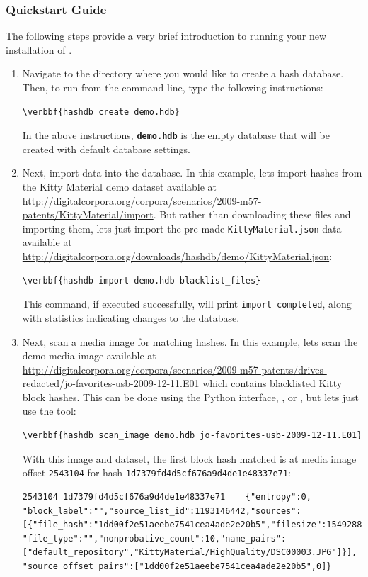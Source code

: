 \documentclass[11pt,fleqn]{article} %
\begin{document}
\subsubsection{Quickstart Guide}
The following steps provide a very brief introduction to running your new installation of \hdb. 
\begin{enumerate}
\item Navigate to the directory where you would like to create a hash database. Then, to run \hdb from the command line, type the following instructions: 
\begin{Verbatim}[commandchars=\\\{\}]
\verbbf{hashdb create demo.hdb}
\end{Verbatim} 

In the above instructions, \texttt{\textbf{demo.hdb}} is the empty database that will be created with default database settings.

\item Next, import data into the database. In this example, lets import hashes from the Kitty Material demo dataset available at \url{http://digitalcorpora.org/corpora/scenarios/2009-m57-patents/KittyMaterial/import}. But rather than downloading these files and importing them, lets just import the pre-made \verb+KittyMaterial.json+ data available at \url{http://digitalcorpora.org/downloads/hashdb/demo/KittyMaterial.json}:
\begin{Verbatim}[commandchars=\\\{\}]
\verbbf{hashdb import demo.hdb blacklist_files}
\end{Verbatim} 
This command, if executed successfully, will print \verb+import completed+, along with statistics indicating changes to the database.

\item Next, scan a media image for matching hashes. In this example, lets scan the demo media image available at \url{ http://digitalcorpora.org/corpora/scenarios/2009-m57-patents/drives-redacted/jo-favorites-usb-2009-12-11.E01} which contains blacklisted Kitty block hashes. This can be done using the Python interface, \sscope, or \bulk, but lets just use the \hdb tool:
\begin{Verbatim}[commandchars=\\\{\}]
\verbbf{hashdb scan_image demo.hdb jo-favorites-usb-2009-12-11.E01}
\end{Verbatim} 
With this image and dataset, the first block hash matched is at media image offset \verb+2543104+ for hash \verb+1d7379fd4d5cf676a9d4de1e48337e71+:

\begingroup
\footnotesize
\begin{Verbatim}[fontfamily=courier]
2543104	1d7379fd4d5cf676a9d4de1e48337e71	{"entropy":0,
"block_label":"","source_list_id":1193146442,"sources":
[{"file_hash":"1dd00f2e51aeebe7541cea4ade2e20b5","filesize":1549288,
"file_type":"","nonprobative_count":10,"name_pairs":
["default_repository","KittyMaterial/HighQuality/DSC00003.JPG"]}],
"source_offset_pairs":["1dd00f2e51aeebe7541cea4ade2e20b5",0]}
\end{Verbatim}
\endgroup

\end{enumerate}
\end{document}
